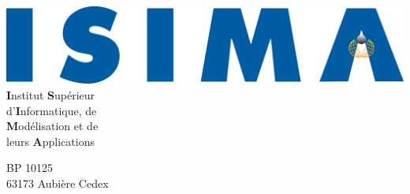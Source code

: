 \thispagestyle{empty}

\makeatletter %



\begin{multicols}{2}
	\begin{flushleft}
	
	
		\includegraphics[scale=0.09]{img/ISIMA_logo.png}					\\
		
		\textbf{I}nstitut \textbf{S}upérieur								\\
		d'\textbf{I}nformatique, de											\\
		\textbf{M}odélisation et de											\\
		leurs \textbf{A}pplications	
		
		\vspace*{0.5cm}
		
		BP 10125															\\
		63173 Aubière Cedex
		
		
	\end{flushleft}
\columnbreak
	\begin{flushright}
	
		
		
	\end{flushright}
\end{multicols}

\vspace*{\fill}

